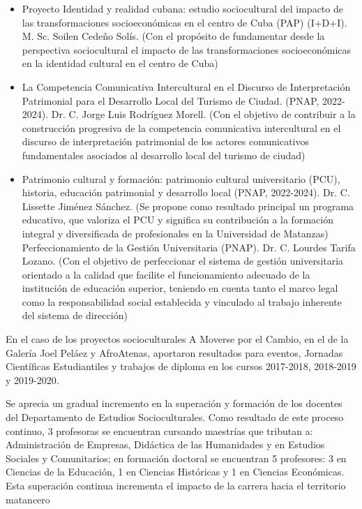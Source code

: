 \begin{itemize}
	\setlength\itemsep{-0.5em}
	\item Proyecto Identidad y realidad cubana: estudio sociocultural del impacto de las transformaciones socioeconómicas en el centro de Cuba (PAP) (I+D+I). M. Sc. Soilen Cedeño Solís. (Con el propósito de fundamentar desde la perspectiva sociocultural el impacto de las transformaciones socioeconómicas en la identidad cultural en el centro de Cuba)
	\item La Competencia Comunicativa Intercultural en el Discurso de Interpretación Patrimonial para el Desarrollo Local del Turismo de Ciudad. (PNAP, 2022-2024). Dr. C. Jorge Luis Rodríguez Morell. (Con el objetivo de contribuir a la construcción progresiva de la competencia comunicativa intercultural en el discurso de interpretación patrimonial de los actores comunicativos fundamentales asociados al desarrollo local del turismo de ciudad)
	\item Patrimonio cultural y formación: patrimonio cultural universitario (PCU), historia, educación patrimonial y desarrollo local (PNAP, 2022-2024). Dr. C. Lissette Jiménez Sánchez. (Se propone como resultado principal un programa educativo, que valoriza el PCU y significa su contribución a la formación integral y diversificada de profesionales en la Universidad de Matanzas)
	Perfeccionamiento de la Gestión Universitaria (PNAP). Dr. C. Lourdes Tarifa Lozano. (Con el objetivo de perfeccionar el sistema de gestión universitaria orientado a la calidad que facilite el funcionamiento adecuado de la institución de educación superior, teniendo en cuenta tanto el marco legal como la responsabilidad social establecida y vinculado al trabajo inherente del sistema de dirección)
\end{itemize}

En el caso de los proyectos socioculturales A Moverse por el Cambio, en el de la Galería Joel Peláez y AfroAtenas, aportaron resultados para eventos, Jornadas Científicas Estudiantiles y trabajos de diploma en los cursos 2017-2018, 2018-2019 y 2019-2020.

Se aprecia un gradual incremento en la superación y formación de los docentes del Departamento de Estudios Socioculturales. Como resultado de este proceso continuo, 3 profesoras se encuentran cursando maestrías que tributan a: Administración de Empresas, Didáctica de las Humanidades y en Estudios Sociales y Comunitarios; en formación doctoral se encuentran 5 profesores: 3 en Ciencias de la Educación, 1 en Ciencias Históricas y 1 en Ciencias Económicas. Esta superación continua incrementa el impacto de la carrera hacia el territorio matancero

